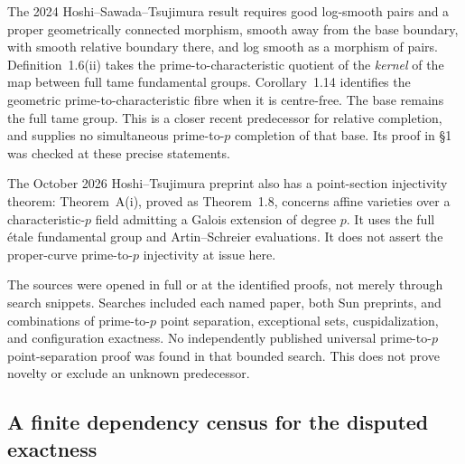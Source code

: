 The 2024 Hoshi--Sawada--Tsujimura result requires good log-smooth
pairs and a proper geometrically connected morphism, smooth away
from the base boundary, with smooth relative boundary there, and
log smooth as a morphism of pairs. Definition~1.6(ii) takes the
prime-to-characteristic quotient of the \emph{kernel} of the map
between full tame fundamental groups. Corollary~1.14 identifies
the geometric prime-to-characteristic fibre when it is centre-free.
The base remains the full tame group. This is a closer recent
predecessor for relative completion, and supplies no simultaneous
prime-to-$p$ completion of that base. Its proof in \S1 was checked
at these precise statements.
\citep[Definitions~1.1,1.3,1.6 and Corollary~1.14]{LA_HST2024}

The October 2026 Hoshi--Tsujimura preprint also has a point-section
injectivity theorem: Theorem~A(i), proved as Theorem~1.8, concerns
affine varieties over a characteristic-$p$ field admitting a Galois
extension of degree $p$. It uses the full \'etale fundamental group
and Artin--Schreier evaluations. It does not assert the proper-curve
prime-to-$p$ injectivity at issue here.
\citep[Theorem~A(i) and Theorem~1.8]{LA_HT2026}

The sources were opened in full or at the identified proofs, not merely
through search snippets. Searches included each named paper, both Sun
preprints, and combinations of prime-to-$p$ point separation, exceptional
sets, cuspidalization, and configuration exactness. No independently
published universal prime-to-$p$ point-separation proof was found in
that bounded search. This does not prove novelty or exclude an unknown
predecessor.\citep{LA_Mochizuki2007,LA_Mochizuki2014,LA_ST2009,
LA_ST2017,LA_MT2008,LA_Stix2005,LA_Wakabayashi2016,LA_Sun2025,
LA_SGA1,LA_BoggiZalesskii2019,LA_HST2024,LA_HT2026}

\subsection{A finite dependency census for the disputed exactness}


